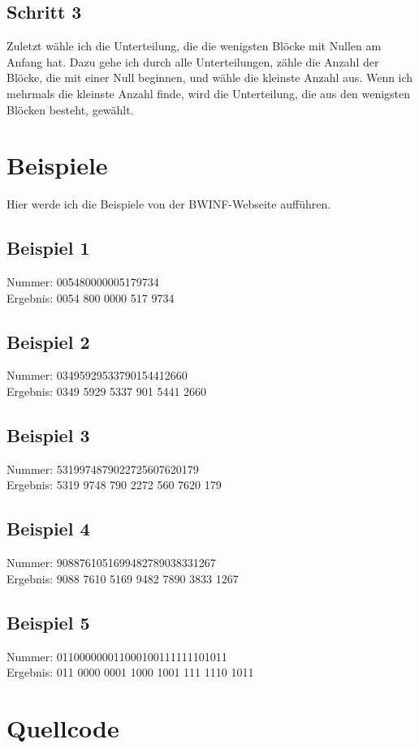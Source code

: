 \documentclass[a4paper,10pt]{scrartcl}
\begin{document}
\subsection{Schritt 3}
Zuletzt wähle ich die Unterteilung, die die wenigsten Blöcke  mit Nullen am Anfang hat. Dazu gehe ich durch alle Unterteilungen, zähle die Anzahl der Blöcke, die mit einer Null beginnen, und wähle die kleinste Anzahl aus. Wenn ich mehrmals die kleinste Anzahl finde, wird die Unterteilung, die aus den wenigsten Blöcken besteht, gewählt.

\section{Beispiele}
Hier werde ich die Beispiele von der BWINF-Webseite aufführen.

\subsection{Beispiel 1}
Nummer: 005480000005179734 \\
Ergebnis: 0054
800
0000
517
9734

\subsection{Beispiel 2}
Nummer: 03495929533790154412660 \\
Ergebnis: 0349
5929
5337
901
5441
2660

\subsection{Beispiel 3}
Nummer: 5319974879022725607620179 \\
Ergebnis: 5319
9748
790
2272
560
7620
179

\subsection{Beispiel 4}
Nummer: 9088761051699482789038331267 \\
Ergebnis: 9088
7610
5169
9482
7890
3833
1267

\subsection{Beispiel 5}
Nummer: 011000000011000100111111101011 \\
Ergebnis: 011
0000
0001
1000
1001
111
1110
1011

\section{Quellcode}

\end{document}

